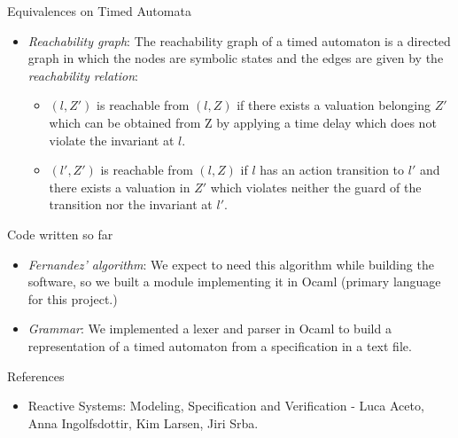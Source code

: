 \documentclass{beamer}
\begin{document}
\begin{frame}{Equivalences on Timed Automata}

  \begin{itemize}

    \item \emph{Reachability graph}: The reachability graph of a timed
      automaton is a directed graph in which the nodes are symbolic states
      and the edges are given by the \emph{reachability relation}:
      \begin{itemize}
      \item $(l,Z')$ is reachable from $(l,Z)$ if there exists a
        valuation belonging $Z'$ which can be obtained
        from Z by applying a time delay which does not violate the
        invariant at $l$.
        
      \item $(l', Z')$ is reachable from $(l, Z)$ if $l$ has an action
        transition to $l'$ and there exists a valuation in $Z'$ which
        violates neither the guard of the
        transition nor the invariant at $l'$.
        
      \end{itemize}

  \end{itemize}

\end{frame}

\begin{frame}{Code written so far}

  \begin{itemize}

    \item \emph{Fernandez' algorithm}: We expect to need this
      algorithm while building the software, so we built a module
      implementing it in Ocaml (primary language for this project.)

    \item \emph{Grammar}: We implemented a lexer and parser in Ocaml
      to build a representation of a timed automaton from a
      specification in a text file.

  \end{itemize}

\end{frame}

\begin{frame}{References}

\begin{itemize}
\item Reactive Systems: Modeling, Specification and Verification -
  Luca Aceto, Anna Ingolfsdottir, Kim Larsen, Jiri Srba.
\end{itemize}

\end{frame}
\end{document}
